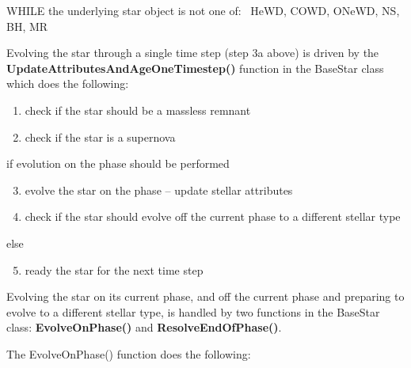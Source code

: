 \bigskip
\tabto{2em}WHILE the underlying star object is not one of: \lcb\ HeWD, COWD, ONeWD, NS, BH, MR\ \rcb

\bigskip
Evolving the star through a single time step (step 3a above) is driven by the \nobreak\textbf{UpdateAttributesAndAgeOneTimestep()} function in the BaseStar class which does the following:

\begin{enumerate}
    \item {check if the star should be a massless remnant}
    \item {check if the star is a supernova}
\end{enumerate}

\tabto{1.2em}if evolution on the phase should be performed

\hfill
\begin{minipage}{\dimexpr\textwidth-2em}
    \begin{enumerate}
        \setcounter{enumi}{2}
        \item  evolve the star on the phase -- update stellar attributes
        \item  check if the star should evolve off the current phase to a different stellar type
    \end{enumerate}
\end{minipage}

\medskip\tabto{1.2em}else

\hfill
\begin{minipage}{\dimexpr\textwidth-2em}
    \begin{enumerate}
        \setcounter{enumi}{4}
        \item  ready the star for the next time step
    \end{enumerate}
\end{minipage}

\newpage
Evolving the star on its current phase, and off the current phase and preparing to evolve to a different stellar type, is handled by two functions in the BaseStar class: \textbf{EvolveOnPhase()} and \textbf{ResolveEndOfPhase()}.

The EvolveOnPhase() function does the following:

